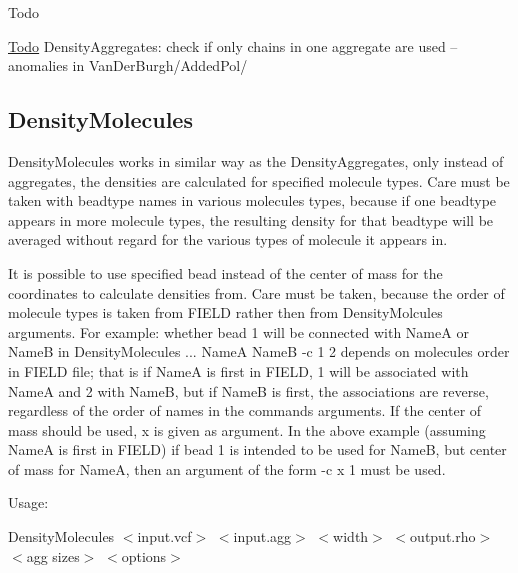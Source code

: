 \begin{DoxyRefDesc}{Todo}
\item[\hyperlink{todo__todo000002}{Todo}]Density\+Aggregates\+: check if only chains in one aggregate are used -- anomalies in Van\+Der\+Burgh/\+Added\+Pol/\end{DoxyRefDesc}
\hypertarget{Common_DensityMolecules}{}\subsection{Density\+Molecules}\label{Common_DensityMolecules}
Density\+Molecules works in similar way as the Density\+Aggregates, only instead of aggregates, the densities are calculated for specified molecule types. Care must be taken with beadtype names in various molecules types, because if one beadtype appears in more molecule types, the resulting density for that beadtype will be averaged without regard for the various types of molecule it appears in.

It is possible to use specified bead instead of the center of mass for the coordinates to calculate densities from. Care must be taken, because the order of molecule types is taken from {\ttfamily F\+I\+E\+LD} rather then from {\ttfamily Density\+Molcules} arguments. For example\+: whether bead 1 will be connected with {\ttfamily NameA} or {\ttfamily NameB} in {\ttfamily Density\+Molecules ... NameA NameB -\/c 1 2} depends on molecules\textquotesingle{} order in {\ttfamily F\+I\+E\+LD} file; that is if {\ttfamily NameA} is first in {\ttfamily F\+I\+E\+LD}, 1 will be associated with {\ttfamily NameA} and 2 with {\ttfamily NameB}, but if {\ttfamily NameB} is first, the associations are reverse, regardless of the order of names in the command\textquotesingle{}s arguments. If the center of mass should be used, {\ttfamily x} is given as argument. In the above example (assuming {\ttfamily NameA} is first in {\ttfamily F\+I\+E\+LD}) if bead 1 is intended to be used for {\ttfamily NameB}, but center of mass for {\ttfamily NameA}, then an argument of the form {\ttfamily -\/c x 1} must be used.

Usage\+:

{\ttfamily Density\+Molecules $<$input.\+vcf$>$ $<$input.\+agg$>$ $<$width$>$ $<$output.\+rho$>$ $<$agg sizes$>$ $<$options$>$}


